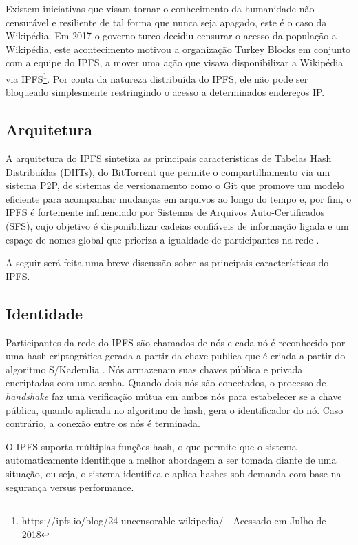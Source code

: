 \documentclass[tcc,capa]{texufpel}
\begin{document}
    Existem iniciativas que visam tornar o conhecimento da humanidade não censurável e resiliente de tal forma que nunca seja apagado, este é o caso da Wikipédia. Em 2017 o governo turco decidiu censurar o acesso da população a Wikipédia, este acontecimento motivou a organização Turkey Blocks em conjunto com a equipe do IPFS, a mover uma ação que visava disponibilizar a Wikipédia via IPFS\footnote{https://ipfs.io/blog/24-uncensorable-wikipedia/ - Acessado em Julho de 2018}. Por conta da natureza distribuída do IPFS, ele não pode ser bloqueado simplesmente restringindo o acesso a determinados endereços IP.

	\subsection{Arquitetura}
	    
        A arquitetura do IPFS sintetiza as principais características de Tabelas Hash Distribuídas (DHTs), do BitTorrent que permite o compartilhamento via um sistema P2P, de sistemas de versionamento como o Git que promove um modelo eficiente para acompanhar mudanças em arquivos ao longo do tempo e, por fim, o IPFS é fortemente influenciado por Sistemas de Arquivos Auto-Certificados (SFS), cujo objetivo é disponibilizar cadeias confiáveis de informação ligada e um espaço de nomes global que prioriza a igualdade de participantes na rede \cite{benet2014ipfs}.
        
        A seguir será feita uma breve discussão sobre as principais características do IPFS.
    
    \subsection{Identidade}
    	
    	Participantes da rede do IPFS são chamados de nós e cada nó é reconhecido por uma hash criptográfica gerada a partir da chave publica que é criada a partir do algoritmo S/Kademlia \cite{benet2014ipfs}. Nós armazenam suas chaves pública e privada encriptadas com uma senha. Quando dois nós são conectados, o processo de \textit{handshake} faz uma verificação mútua em ambos nós para estabelecer se a chave pública, quando aplicada no algoritmo de hash, gera o identificador do nó. Caso contrário, a conexão entre os nós é terminada.
    	
    	O IPFS suporta múltiplas funções hash, o que permite que o sistema automaticamente identifique a melhor abordagem a ser tomada diante de uma situação, ou seja, o sistema identifica e aplica hashes sob demanda com base na segurança versus performance.
        
\end{document}
